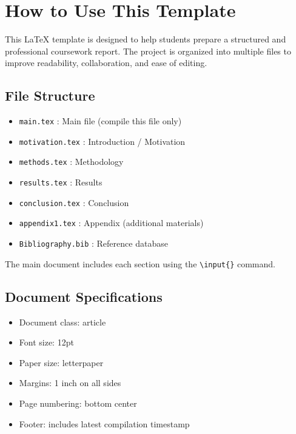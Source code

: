 \section*{How to Use This Template}

This LaTeX template is designed to help students prepare a structured and professional coursework report. The project is organized into multiple files to improve readability, collaboration, and ease of editing.

\subsection*{File Structure}
\begin{itemize}
    \item \texttt{main.tex} : Main file (compile this file only)
    \item \texttt{motivation.tex} : Introduction / Motivation
    \item \texttt{methods.tex} : Methodology
    \item \texttt{results.tex} : Results
    \item \texttt{conclusion.tex} : Conclusion
    \item \texttt{appendix1.tex} : Appendix (additional materials)
    \item \texttt{Bibliography.bib} : Reference database
\end{itemize}

The main document includes each section using the \texttt{\textbackslash input\{\}} command.

\subsection*{Document Specifications}
\begin{itemize}
    \item Document class: article
    \item Font size: 12pt
    \item Paper size: letterpaper
    \item Margins: 1 inch on all sides
    \item Page numbering: bottom center
    \item Footer: includes latest compilation timestamp
\end{itemize}

